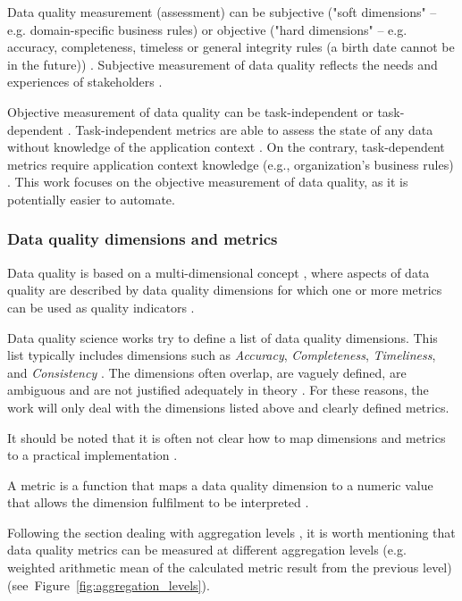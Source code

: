 			Data quality measurement (assessment) can be subjective ("soft dimensions"\cite{Ehrlinger2019} -- e.g. domain-specific business rules) or objective ("hard dimensions"\cite{Ehrlinger2019} -- e.g. accuracy, completeness, timeless or general integrity rules (a birth date
cannot be in the future)) \cite{Pipino2002}. Subjective measurement of data quality reflects the needs and experiences of stakeholders \cite{Pipino2002}.
			
			Objective measurement of data quality can be task-independent or task-dependent \cite{Pipino2002}. Task-independent metrics are able to assess the state of any data without knowledge of the application context \cite{Pipino2002}. On the contrary, task-dependent metrics require application context knowledge (e.g., organization's business rules) \cite{Pipino2002}. This work focuses on the objective measurement of data quality, as it is potentially easier to automate.
				
			\subsubsection{Data quality dimensions and metrics}	
			\label{subsec:data_quality_dimensions_and_metrics}
			
				Data quality is based on a multi-dimensional concept \cite{Ehrlinger2019}, where aspects of data quality are described by data quality dimensions for which one or more metrics can be used as quality indicators \cite{McGilvray2008}.
				
				Data quality science works try to define a list \cite{Pipino2002}\cite{McGilvray2008} of data quality dimensions. This list typically includes dimensions such as \emph{Accuracy}, \emph{Completeness}, \emph{Timeliness}, and \emph{Consistency} \cite{Ehrlinger2019}. The dimensions often overlap, are vaguely defined, are ambiguous and are not justified adequately in theory \cite{Shanks1998}. For these reasons, the work will only deal with the dimensions listed above and clearly defined metrics.
				
				It should be noted that it is often not clear how to map dimensions and metrics to a practical implementation \cite{Ehrlinger2019}.
				
				A metric is a function that maps a data quality dimension to a numeric value that allows the dimension fulfilment to be interpreted \cite{Ehrlinger2019}.
				
				Following the section dealing with aggregation levels , it is worth mentioning that data quality metrics can be measured at different aggregation levels (e.g. weighted arithmetic mean of the calculated metric result from the previous level)(see~Figure~\ref{fig:aggregation_levels}).
				
